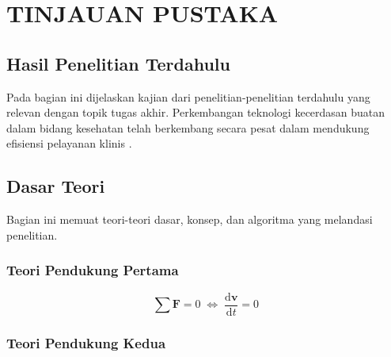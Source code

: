 \chapter{TINJAUAN PUSTAKA}
\label{chap:tinjauanpustaka}

\section{Hasil Penelitian Terdahulu}
\label{sec:penelitianterdahulu}

Pada bagian ini dijelaskan kajian dari penelitian-penelitian terdahulu yang relevan dengan topik tugas akhir. Perkembangan teknologi kecerdasan buatan dalam bidang kesehatan telah berkembang secara pesat dalam mendukung efisiensi pelayanan klinis \parencite{rajpurkar2022ai}.

\lipsum[1]

\section{Dasar Teori}
\label{sec:dasarteori}

Bagian ini memuat teori-teori dasar, konsep, dan algoritma yang melandasi penelitian.

\subsection{Teori Pendukung Pertama}
\label{subsec:teoripertama}

\lipsum[2]

\begin{equation}
  \label{eq:persamaan1}
  \sum \mathbf{F} = 0\; \Leftrightarrow\; \frac{\mathrm{d} \mathbf{v} }{\mathrm{d}t} = 0
\end{equation}

\subsection{Teori Pendukung Kedua}
\label{subsec:teorikedua}

\lipsum[3]
